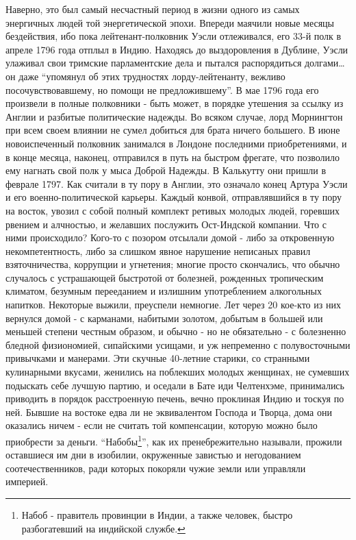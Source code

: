 \documentclass[
  oneside,
  12pt,
  titlepage]{book}
\begin{document}
Наверно, это был самый несчастный период в жизни одного из самых энергичных людей той энергетической эпохи. Впереди маячили новые месяцы бездействия, ибо пока лейтенант-полковник Уэсли отлеживался, его 33-й полк в апреле 1796 года отплыл в Индию. Находясь до выздоровления в Дублине, Уэсли улаживал свои тримские парламентские дела и пытался распорядиться долгами\ldots{} он даже ``упомянул об этих трудностях лорду-лейтенанту, вежливо посочувствовавшему, но помощи не предложившему''. В мае 1796 года его произвели в полные полковники - быть может, в порядке утешения за ссылку из Англии и разбитые политические надежды. Во всяком случае, лорд Морнингтон при всем своем влиянии не сумел добиться для брата ничего большего. В июне новоиспеченный полковник занимался в Лондоне последними приобретениями, и в конце месяца, наконец, отправился в путь на быстром фрегате, что позволило ему нагнать свой полк у мыса Доброй Надежды. В Калькутту они пришли в феврале 1797. Как считали в ту пору в Англии, это означало конец Артура Уэсли и его военно-политической карьеры. Каждый конвой, отправлявшийся в ту пору на восток, увозил с собой полный комплект ретивых молодых людей, горевших рвением и алчностью, и желавших послужить Ост-Индской компании. Что с ними происходило? Кого-то с позором отсылали домой - либо за откровенную некомпетентность, либо за слишком явное нарушение неписаных правил взяточничества, коррупции и угнетения; многие просто скончались, что обычно случалось с устрашающей быстротой от болезней, рожденных тропическим климатом, безумным перееданием и излишним употреблением алкогольных напитков. Некоторые выжили, преуспели немногие. Лет через 20 кое-кто из них вернулся домой - с карманами, набитыми золотом, добытым в большей или меньшей степени честным образом, и обычно - но не обязательно - с болезненно бледной физиономией, сипайскими усищами, и уж непременно с полувосточными привычками и манерами. Эти скучные 40-летние старики, со странными кулинарными вкусами, женились на поблекших молодых женщинах, не сумевших подыскать себе лучшую партию, и оседали в Бате иди Челтенхэме, принимались приводить в порядок расстроенную печень, вечно проклиная Индию и тоскуя по ней. Бывшие на востоке едва ли не эквивалентом Господа и Творца, дома они оказались ничем - если не считать той компенсации, которую можно было приобрести за деньги. ``Набобы\footnote{Набоб - правитель провинции в Индии, а также человек, быстро разбогатевший на индийской службе.}'', как их пренебрежительно называли, прожили оставшиеся им дни в изобилии, окруженные завистью и негодованием соотечественников, ради которых покоряли чужие земли или управляли империей.
\end{document}
